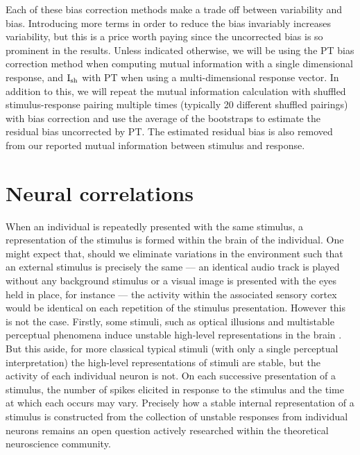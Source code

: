 Each of these bias correction methods make a trade off between variability and bias.
Introducing more terms in order to reduce the bias invariably increases variability, but this is a price worth paying since the uncorrected bias is so prominent in the results.
Unless indicated otherwise, we will be using the \ac{PT} bias correction method when computing mutual information with a single dimensional response, and $\operatorname{I}_{\text{sh}}$ with \ac{PT} when using a multi-dimensional response vector.
In addition to this, we will repeat the mutual information calculation with shuffled stimulus-response pairing multiple times (typically 20 different shuffled pairings) with bias correction and use the average of the bootstraps to estimate the residual bias uncorrected by \ac{PT}.
The estimated residual bias is also removed from our reported mutual information between stimulus and response.


\section{Neural correlations}
\label{sec:bg-corr}

When an individual is repeatedly presented with the same stimulus, a representation of the stimulus is formed within the brain of the individual.
One might expect that, should we eliminate variations in the environment such that an external stimulus is precisely the same --- an identical audio track is played without any background stimulus or a visual image is presented with the eyes held in place, for instance --- the activity within the associated sensory cortex would be identical on each repetition of the stimulus presentation.
However this is not the case.
Firstly, some stimuli, such as optical illusions and multistable perceptual phenomena induce unstable high-level representations in the brain \citep{Lumer1998,Sterzer2009,Watanabe2014}.
But this aside, for more classical typical stimuli (with only a single perceptual interpretation) the high-level representations of stimuli are stable, but the activity of each individual neuron is not.
On each successive presentation of a stimulus, the number of spikes elicited in response to the stimulus and the time at which each occurs may vary.
Precisely how a stable internal representation of a stimulus is constructed from the collection of unstable responses from individual neurons remains an open question actively researched within the theoretical neuroscience community.

